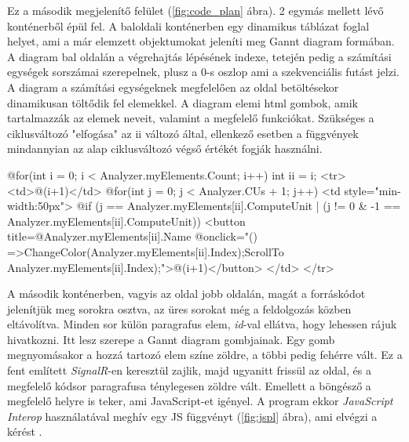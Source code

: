 Ez a második megjelenítő felület (\ref{fig:code_plan} ábra). 2 egymás mellett lévő konténerből épül fel.
A baloldali konténerben egy dinamikus táblázat foglal helyet, ami a már elemzett objektumokat jeleníti meg Gannt diagram formában. A diagram bal oldalán a végrehajtás lépésének indexe, tetején pedig a számítási egységek sorszámai szerepelnek, plusz a 0-s oszlop ami a szekvenciális futást jelzi. A diagram a számítási egységeknek megfelelően az oldal betöltésekor dinamikusan töltődik fel elemekkel. A diagram elemi html gombok, amik tartalmazzák az elemek neveit, valamint a megfelelő funkciókat. Szükséges a ciklusváltozó "elfogása" az ii változó által, ellenkező esetben a függvények mindannyian az alap ciklusváltozó végső értékét fogják használni.

\begin{cpp}
@for(int i = 0; i < Analyzer.myElements.Count; i++)
 {
   int ii = i;
   <tr>
      <td>@(i+1)</td>
      @for(int j = 0; j < Analyzer.CUs + 1; j++)
        {
          <td style="min-width:50px">
          @if (j == Analyzer.myElements[ii].ComputeUnit | (j != 0 &
               -1 == Analyzer.myElements[ii].ComputeUnit))
             {
                <button title=@Analyzer.myElements[ii].Name @onclick="()
                =>{ChangeColor(Analyzer.myElements[ii].Index);ScrollTo
                Analyzer.myElements[ii].Index);}">@(i+1)</button>
             }
          </td>
        }
   </tr>
 }
\end{cpp}


A második konténerben, vagyis az oldal jobb oldalán, magát a forráskódot jelenítjük meg sorokra osztva, az üres sorokat még a feldolgozás közben eltávolítva. Minden sor külön paragrafus elem, \textit{id}-val ellátva, hogy lehessen rájuk hivatkozni. Itt lesz szerepe a Gannt diagram gombjainak. Egy gomb megnyomásakor a hozzá tartozó elem színe zöldre, a többi pedig fehérre vált. Ez a fent említett \textit{SignalR}-en keresztül zajlik, majd ugyanitt frissül az oldal, és a megfelelő kódsor paragrafusa ténylegesen zöldre vált. Emellett a böngésző a megfelelő helyre is teker, ami JavaScript-et igényel. A program ekkor \textit{JavaScript Interop} használatával meghív egy JS függvényt (\ref{fig:jspl} ábra), ami elvégzi a kérést \cite{js_interop}.


